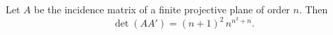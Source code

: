 Let $A$ be the incidence matrix of a finite projective plane of order $n$. Then
$$\det(AA') = (n+1)^2 \, n^{n^2+n}.$$
